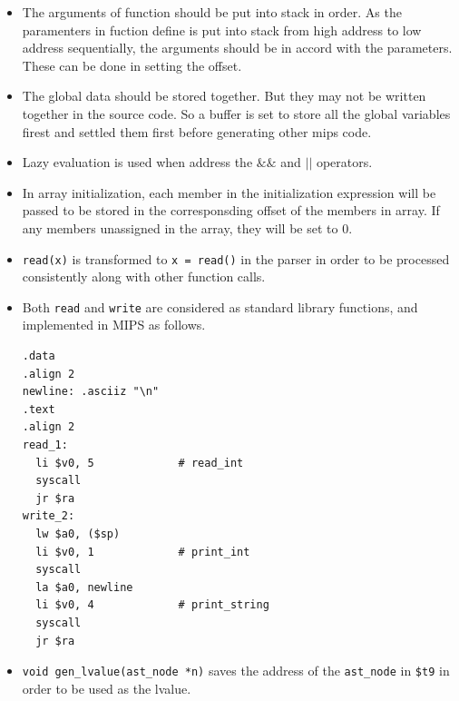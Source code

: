 \documentclass[a4paper]{article}
\begin{document}
\begin{itemize}
    \item The arguments of function should be put into stack in order. As the paramenters in fuction define is put into stack from high address to low address sequentially, the arguments should be in accord with the parameters. These can be done in setting the offset.
    \item The global data should be stored together. But they may not be written together in the source code. So a buffer is set to store all the global variables firest and settled them first before generating other mips code.
    \item Lazy evaluation is used when address the $\&\&$ and $||$ operators.
    \item In array initialization, each member in the initialization expression will be passed to be stored in the corresponsding offset of the members in array. If any members unassigned in the array, they will be set to 0.
    \item {\tt read(x)} is transformed to {\tt x = read()} in the parser in order to be processed consistently along with other function calls.
    \item Both {\tt read} and {\tt write} are considered as standard library functions, and implemented in MIPS as follows.
\begin{verbatim}
.data 
.align 2
newline: .asciiz "\n"
.text
.align 2
read_1:
  li $v0, 5             # read_int
  syscall
  jr $ra
write_2:
  lw $a0, ($sp)
  li $v0, 1             # print_int
  syscall
  la $a0, newline
  li $v0, 4             # print_string
  syscall
  jr $ra
\end{verbatim}
    \item {\tt void gen\_lvalue(ast\_node *n)} saves the address of the {\tt ast\_node} in {\tt \$t9} in order to be used as the lvalue.
\end{itemize}
\end{document}
